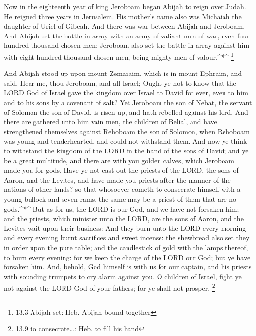  Now in the eighteenth year of king Jeroboam began Abijah to
reign over Judah.  He reigned three years in Jerusalem. His
mother's name also was Michaiah the daughter of Uriel of Gibeah. And
there was war between Abijah and Jeroboam.  And Abijah set
the battle in array with an army of valiant men of war, even four
hundred thousand chosen men: Jeroboam also set the battle in array
against him with eight hundred thousand chosen men, being mighty men of
valour.\^{}*\^{} \footnote{13.3 Abijah set: Heb. Abijah bound together}

 And Abijah stood up upon mount Zemaraim, which is in mount
Ephraim, and said, Hear me, thou Jeroboam, and all Israel; 
Ought ye not to know that the LORD God of Israel gave the kingdom over
Israel to David for ever, even to him and to his sons by a covenant of
salt?  Yet Jeroboam the son of Nebat, the servant of Solomon
the son of David, is risen up, and hath rebelled against his lord.
 And there are gathered unto him vain men, the children of
Belial, and have strengthened themselves against Rehoboam the son of
Solomon, when Rehoboam was young and tenderhearted, and could not
withstand them.  And now ye think to withstand the kingdom
of the LORD in the hand of the sons of David; and ye be a great
multitude, and there are with you golden calves, which Jeroboam made you
for gods.  Have ye not cast out the priests of the LORD, the
sons of Aaron, and the Levites, and have made you priests after the
manner of the nations of other lands? so that whosoever cometh to
consecrate himself with a young bullock and seven rams, the same may be
a priest of them that are no gods.\^{}*\^{}  But as for us,
the LORD is our God, and we have not forsaken him; and the priests,
which minister unto the LORD, are the sons of Aaron, and the Levites
wait upon their business:  And they burn unto the LORD
every morning and every evening burnt sacrifices and sweet incense: the
shewbread also set they in order upon the pure table; and the
candlestick of gold with the lamps thereof, to burn every evening: for
we keep the charge of the LORD our God; but ye have forsaken him.
 And, behold, God himself is with us for our captain, and
his priests with sounding trumpets to cry alarm against you. O children
of Israel, fight ye not against the LORD God of your fathers; for ye
shall not prosper. \footnote{13.9 to consecrate\ldots: Heb. to fill his
  hand}

